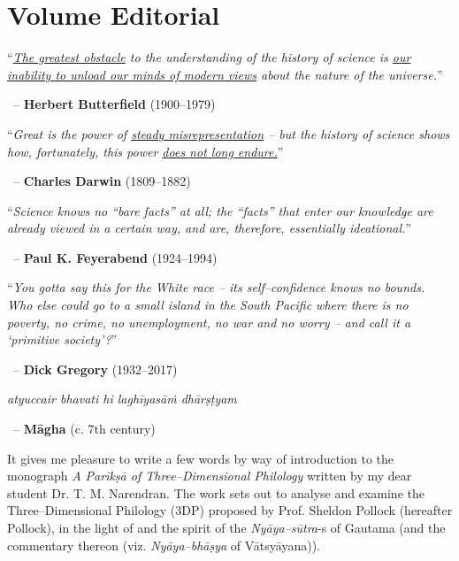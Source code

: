 
\chapter*{Volume Editorial}\label{volumeeditorial}

\begin{myquote}
“\textit{\underline{The greatest obstacle} to the understanding of the history of science is \underline{our inability to unload our minds of modern views} about the nature of the universe.}”
\end{myquote}


~\hfill – \textbf{Herbert Butterfield} (1900–1979)

\begin{myquote}
“\textit{Great is the power of \underline{steady misrepresentation} – but the history of science shows how, fortunately, this power \underline{does not long endure.}}”
\end{myquote}


~\hfill – \textbf{Charles Darwin} (1809–1882)

\begin{myquote}
“\textit{Science knows no “bare facts” at all; the “facts” that enter our knowledge are already viewed in a certain way, and are, therefore, essentially ideational.}”
\end{myquote}


~\hfill – \textbf{Paul K. Feyerabend} (1924–1994)

\begin{myquote}
“\textit{You gotta say this for the White race – its self–confidence knows no bounds. Who else could go to a small island in the South Pacific where there is no poverty, no crime, no unemployment, no war and no worry – and call it a ‘primitive society’?}”
\end{myquote}


~\hfill – \textbf{Dick Gregory } (1932–2017)

\begin{myquote}
\textit{atyuccair bhavati hi laghīyasāṁ dhārṣṭyam}
\end{myquote}


~\hfill – \textbf{Māgha} (c. 7th century)

It gives me pleasure to write a few words by way of introduction to the monograph \textit{A Parīkṣā of Three–Dimensional Philology} written by my dear student Dr. T. M. Narendran. The work sets out to analyse and examine the Three–Dimensional Philology (3DP) proposed by Prof. Sheldon Pollock (hereafter Pollock), in the light of and the spirit of the \textit{Nyāya–sūtra}-s of Gautama (and the commentary thereon (viz. \textit{Nyāya–bhāṣya} of Vātsyāyana)).

